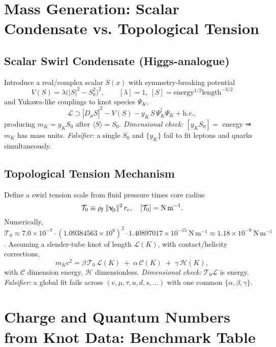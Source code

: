 \documentclass[10pt,reprint,aps,onecolumn,nofootinbib]{revtex4-2}
\newcommand{\vswirl}{\mathbf{v}_{\!\mkern-2mu\scriptscriptstyle\boldsymbol{\circlearrowleft}}}
\newcommand{\rhof}{\rho_{\!f}}                           %
\newcommand{\rhoF}{\rhof}
\newcommand{\rc}{r_c}                                    %
\begin{document}

    \section{Mass Generation: Scalar Condensate vs. Topological Tension}
    \label{sec:SST-mass-gen}

    \subsection{Scalar Swirl Condensate (Higgs-analogue)}
        Introduce a real/complex scalar $S(x)$ with symmetry-breaking potential
        \[
            V(S)=\lambda\big(|S|^2-S_0^2\big)^2,\qquad [\lambda]=1,\ [S]=\mathrm{energy}^{1/2}\mathrm{length}^{-3/2}
        \]
        and Yukawa-like couplings to knot species $\Psi_K$,
        \[
            \mathcal{L}\supset |D_\mu S|^2 - V(S) - y_K\,S\,\Psi_K^\dagger\Psi_K + \text{h.c.},
        \]
        producing \(m_K = y_K S_0\) after \(\langle S\rangle=S_0\). \emph{Dimensional check:}
        \([y_K S_0]=\) energy ⇒ \(m_K\) has mass units. \emph{Falsifier:} a single \(S_0\) and \(\{y_K\}\) fail to fit leptons and quarks simultaneously.

    \subsection{Topological Tension Mechanism}
        Define a swirl tension scale from fluid pressure times core radius
        \[
            \mathcal{T}_0 \equiv \rhoF\,\lVert\vswirl\rVert^2\,\rc,\quad [\mathcal{T}_0]=\mathrm{N\,m^{-1}}.
        \]
        Numerically, \(\mathcal{T}_0 \approx 7.0\times10^{-7}\cdot(1.09384563\times10^{6})^2\cdot 1.40897017\times10^{-15}\ \mathrm{N\,m^{-1}}
    \approx 1.18\times10^{-9}\ \mathrm{N\,m^{-1}}\).
        Assuming a slender-tube knot of length \(\mathcal{L}(K)\), with contact/helicity corrections,
        \[
            m_K c^2=\beta\,\mathcal{T}_0\,\mathcal{L}(K)\;+\;\alpha\,\mathcal{C}(K)\;+\;\gamma\,\mathcal{H}(K),
        \]
        with \(\mathcal{C}\) dimension energy, \(\mathcal{H}\) dimensionless. \emph{Dimensional check:} \(\mathcal{T}_0\mathcal{L}\) is energy. \emph{Falsifier:} a global fit fails across \((e,\mu,\tau,u,d,s,\ldots)\) with one common \(\{\alpha,\beta,\gamma\}\).


    \section{Charge and Quantum Numbers from Knot Data: Benchmark Table}
    \label{sec:SST-particle-table}
\end{document}
